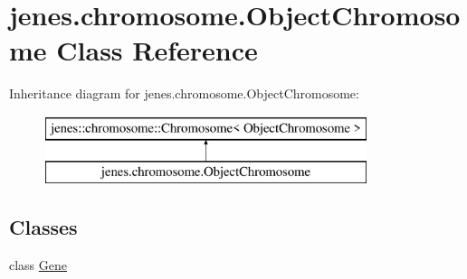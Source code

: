 \hypertarget{classjenes_1_1chromosome_1_1_object_chromosome}{\section{jenes.\-chromosome.\-Object\-Chromosome Class Reference}
\label{classjenes_1_1chromosome_1_1_object_chromosome}
}
Inheritance diagram for jenes.\-chromosome.\-Object\-Chromosome\-:\begin{figure}[H]
\begin{center}
\leavevmode
\includegraphics[height=2.000000cm]{classjenes_1_1chromosome_1_1_object_chromosome}
\end{center}
\end{figure}
\subsection*{Classes}
\begin{DoxyCompactItemize}
\item 
class \hyperlink{classjenes_1_1chromosome_1_1_object_chromosome_1_1_gene}{Gene}
\end{DoxyCompactItemize}
